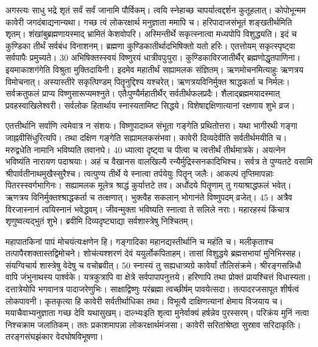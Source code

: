 अगस्त्यः
साधु भद्रे शृतं सर्वं सर्वं जानामि पौर्विकम्।
 त्वयि स्नेहाच्छ चापर्यात्वद्दर्शन कुतूहलात्।
 कोपोभून्मम कावेरी जगदंबाद्यनान्यथा।
 गच्छ त्वं लोकरक्षार्थ मनुज्ञाता ममापि च।
 हरिपादाजसंभूतं शङ्खतीर्थमिति शृतम्।
 शंखांबुब्रह्मणायस्माद् भ्रामितं केशवोपरि।
 अस्मिन्तीर्थे सकृत्स्नात्वा मध्यपोपि विशुद्ध्यति।
 इदं च कुण्डिका तीर्थं सर्वबंध विनाशनम्।
 ब्रह्मणा कुण्डिकातीर्थादभिषिक्तो यतो हरिः।
 एतत्तोयम् सकृत्स्पृष्ट्वा सर्वपापैः प्रमुच्यते।
 30 अभिषिक्तस्स्वयं विष्णुरयं धात्रीवपुःपुरा।
 कुण्डिकाविरजातीर्थैर् ब्रह्मणोद्धृतपाणिना।
 इयमाकाशगंगेति विश्रुता मुक्तिदायिनी।
 इदमेव महातीर्थं सह्यामलक संज्ञितम्।
 ऋणमोचनमित्याहुः ऋणत्रय विमोचनात्।
 अस्यास्तीरे सकृत्पिण्डम् पितॄनुद्दिश्य यश्चरेत्।
 ऋणत्रयविनिर्मुक्त श्राद्धकर्ता च निर्मलः।
 सर्वक्रतुफलं प्राप्य विष्णुसारूप्यमश्नुते।
 एतैःपुण्यैर्महातीर्थैर् सर्वतीर्थफलप्रदैः।
 शैलाद्ब्रह्ममयादस्मात् प्रवहस्वाखिलेश्वरी।
 सर्वलोक हितार्थाय स्नास्यतामिष्ट सिद्धये।
 विशेषाद्दक्षिणात्यानां रक्षणाय शुभे व्रज।
 
एतत्तीर्थानि सर्वाणि त्वमेवात्र न संशयः।
 विष्णुपादाब्ज संभूता गङ्गेति प्रथितोत्तरा।
 यथा भागीरथी गङ्गा जाह्नवीसिंधुरित्यपि।
 तथा दक्षिण गङ्गेति सह्यामलकसंभवा।
 कावेरी दिव्यदेवीति सर्वतीर्थमयीति च।
 मरुद्वधेति नामानि भविष्यति तवानघे।
 40 ध्यात्वा दृष्ट्वा च पीत्वा च त्वत्तीर्थं तीर्थमात्रके।
 अयत्नेन भविष्यंति नारायण पदाश्रयाः।
 अहं च वैखानस वालखिल्यै
रन्यैर्मुद्रिस्सनकादिभिश्च।
 सर्वत्र ते पुण्यतटे वसामि
श्रीपार्वतीनाथमुखैस्सुरैश्च।
 त्वत्पुण्य तीर्थे ये स्नात्वा तर्पयेयुः पितॄन् जलैः।
 आकल्पं तृप्तिमापन्नाः पितरस्स्वर्गभागिनः।
 सह्यामलक मूलेत्र श्राद्धं कुर्यात्तटे तव।
 अर्धोदये पितॄणाम् तु गयाश्राद्धफलं भवेत्।
 ऋणत्रय विनिर्मुक्तश्श्राद्धकर्ता च तत्क्षणात्।
 भुक्त्वैह सकलान् भोगानंते विष्णुपदम् व्रजेत्।
 45।
 अत्रैव विरजास्नानं त्वयिस्नानं भवेद्धवम्।
 जीवन्मुक्ता भविष्यति स्नात्वा ते सलिले नराः।
 महारहस्यं किंचात्र शृणुष्वत्यद्भुतं शुभे।
 ब्रवीमि दिव्यदृष्ट्याद्या सर्वशास्त्रेषु निश्चितम्।
 
महापातकिनां पापं मोचयंत्यःक्षणेन हि।
 गङ्गादिका महानद्यस्तीर्थानि च महंति च।
 मलीकृताश्च तत्पापैरशक्तास्तद्विमोचने।
 शोचंत्यश्शरणं देवं ययुर्लोकपिताहम्।
 तासां विशुद्धये ब्रह्मसभायां मुनिभिस्सह।
 संयग्विचार्य शास्त्रेषु वेदेषु च वचोब्रवीत्।
 50 स्नास्यं तु सह्यधात्र्यग्रे कावेर्यां तौलिसंक्रमे।
 श्रीरङ्गसन्निधौ वापि जंभुनाथस्य पार्श्वके।
 यत्रकुत्रापि वा क्षेत्रे सर्वपापापनुत्तये।
 हरिणापि तथा प्रोक्तं प्रायश्चित्तं विधास्यता।
 दत्तात्रेयोपि भगवानत्र पादाजरेणुभिः।
 साक्षाद्विष्णुः परंब्रह्मा त्वच्छीर्षम् पावयेत्सदा।
 तत्पादरजसापूत शीर्षत्वं लोकपावनी।
 कृतकृत्या हि कावेरी सर्वतीर्थाधिका तथा।
 विभूत्यै दाक्षिणत्यानां क्षेमाय विजयाय च।
 मयाचैवाभ्यनुज्ञाता गच्छ देवि यथासुखम्।
 दाल्भ्यःइति शृत्वा मुनेर्वाक्यं हर्षन्नेव पुरस्सरम्।
 परिक्रंय मुनिं नत्वा निश्चक्राम जलांतिकम्।
 ततः प्रकाशमापन्ना लोकरक्षार्थमंजसा।
 कावेरी सरितांश्रेष्ठा सुस्राव सरिदाकृतिः।
 तरङ्गसंघझंकार वेदघोषविभूषणा।
 
